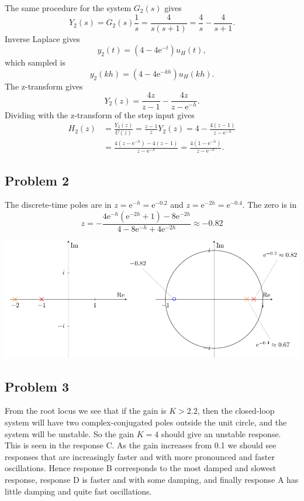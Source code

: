 \documentclass[letter,12pt]{scrartcl}
\newcommand*{\mexp}[1]{\ensuremath{\mathrm{e}^{#1}}}
\begin{document}
   The same procedure for the system \(G_2(s)\) gives 
   \[Y_2(s) = G_2(s)\frac{1}{s} = \frac{4}{s(s+1)} = \frac{4}{s} - \frac{4}{s+1}.\] Inverse Laplace gives
   \[y_2(t) = (4 - 4\mexp{-t})u_H(t), \] which sampled is 
   \[y_2(kh) = (4 - 4\mexp{-kh})u_H(kh).\] The z-transform gives
   \[Y_2(z) = \frac{4z}{z-1} - \frac{4z}{z-\mexp{-h}}.\] Dividing with the z-transform of the step input gives 
   \begin{align*}
   H_2(z) &= \frac{Y_2(z)}{U(z)} = \frac{z-1}{z}Y_2(z) = 4 - \frac{4(z-1)}{z-\mexp{-h}}\\
          &= \frac{4(z-\mexp{-h}) - 4(z-1)}{z-\mexp{-h}} = \frac{4(1-\mexp{-h})}{z-\mexp{-h}}.
   \end{align*}
   

\subsection*{Problem 2}
The discrete-time poles are in $z=\mexp{-h}=\mexp{-0.2}$ and $z=\mexp{-2h}=\mexp{-0.4}$. The zero is  in 
\[ z = - \frac{4\mexp{-h}(\mexp{-2h} +1 ) -8\mexp{-2h}}{ 4 - 8\mexp{-h} +4\mexp{-2h}} \approx -0.82\]
\begin{center}
\includegraphics[width=0.8\linewidth]{complex-plane-facit-vt17}
\end{center}
 
\subsection*{Problem 3}
From the root locus we see that if the gain is $K>2.2$, then the closed-loop system will have two complex-conjugated poles outside the unit circle, and the system will be unstable. So the gain $K=4$ should give an unstable response. This is seen in the response C. As the gain increases from 0.1 we should see responses that are increasingly faster and with more pronounced and faster oscillations. Hence response B corresponds to the most damped and slowest response, response D is faster and with some damping, and finally response A has little damping and quite fast oscillations. 
\end{document}
